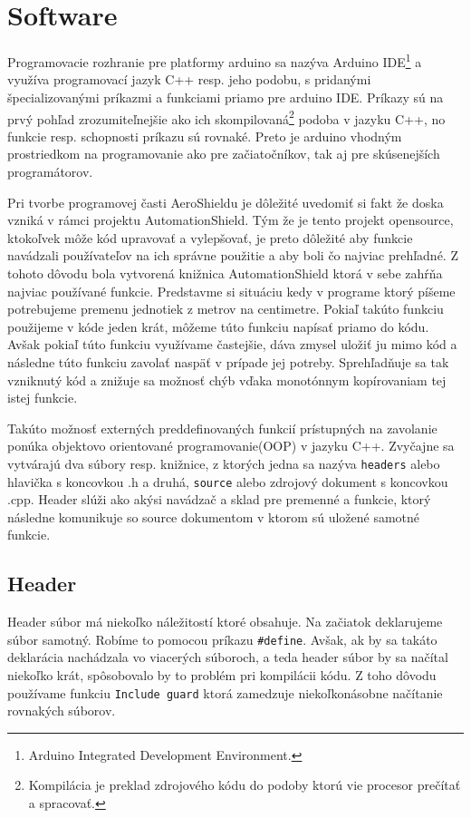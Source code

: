 \section{Software}

Programovacie rozhranie pre platformy arduino sa nazýva Arduino IDE\footnote[5]{Arduino Integrated Development Environment.} a využíva programovací jazyk C++ resp. jeho podobu, s pridanými špecializovanými príkazmi a funkciami priamo pre arduino IDE. Príkazy sú na prvý pohľad zrozumiteľnejšie ako ich skompilovaná\footnote[6]{Kompilácia je preklad zdrojového kódu do podoby ktorú vie procesor prečítať a spracovať.} podoba v jazyku C++, no funkcie resp. schopnosti príkazu sú rovnaké. Preto je arduino vhodným prostriedkom na programovanie ako pre začiatočníkov, tak aj pre skúsenejších programátorov. 

Pri tvorbe programovej časti AeroShieldu je dôležité uvedomiť si fakt že doska vzniká v rámci projektu AutomationShield. Tým že je tento projekt opensource, ktokoľvek môže kód upravovať a vylepšovať, je preto dôležité aby funkcie navádzali používateľov na ich správne použitie a aby boli čo najviac prehľadné. Z tohoto dôvodu bola vytvorená knižnica AutomationShield ktorá v sebe zahŕňa najviac používané funkcie. Predstavme si situáciu kedy v programe ktorý píšeme potrebujeme premenu jednotiek z metrov na centimetre. Pokiaľ takúto funkciu použijeme v kóde jeden krát, môžeme túto funkciu napísať priamo do kódu. Avšak pokiaľ túto funkciu využívame častejšie, dáva zmysel uložiť ju mimo kód a následne túto funkciu zavolať naspäť v prípade jej potreby. Sprehľadňuje sa tak vzniknutý kód a znižuje sa možnosť chýb vďaka monotónnym kopírovaniam tej istej funkcie. 

Takúto možnosť externých preddefinovaných funkcií prístupných na zavolanie ponúka objektovo orientované programovanie(OOP) v jazyku C++\cite{oop}. Zvyčajne sa vytvárajú dva súbory resp. knižnice, z ktorých jedna sa nazýva \verb|headers| alebo hlavička s koncovkou .h a druhá, \verb|source| alebo zdrojový dokument s koncovkou .cpp. Header slúži ako akýsi navádzač a sklad pre premenné a funkcie, ktorý následne komunikuje so source dokumentom v ktorom sú uložené samotné funkcie. 

\subsection{Header}

Header súbor má niekoľko náležitostí ktoré obsahuje. Na začiatok deklarujeme súbor samotný. Robíme to pomocou príkazu \verb|#define|. Avšak, ak by sa takáto deklarácia nachádzala vo viacerých súboroch, a teda header súbor by sa načítal niekoľko krát, spôsobovalo by to problém pri kompilácii kódu. Z toho dôvodu používame funkciu \verb|Include guard| ktorá zamedzuje niekoľkonásobne načítanie rovnakých súborov. 

